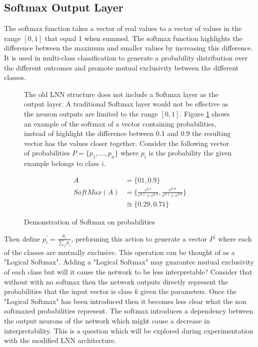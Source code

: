 \subsection{Softmax Output Layer}
The softmax function takes a vector of real values to a vector of values in the range $[0,1]$ that equal 1 when summed. The softmax function highlights the difference between the maximum and smaller values by increasing this difference. It is used in multi-class classification to generate a probability distribution over the different outcomes and promote mutual exclusivity between the different classes.
\begin{figure}[H]
\begin{minipage}[t]{0.57\textwidth}
	\vspace{0px}
	The old LNN structure does not include a Softmax layer as the output layer. A traditional Softmax layer would not be effective as the neuron outputs are limited to the range $[0,1]$. Figure \ref{fig:softmax-failure} shows an example of the softmax of a vector containing probabilities, instead of highlight the difference between 0.1 and 0.9 the resulting vector has the values closer together. Consider the following vector of probabilities $P = \{p_1, ..., p_n\}$ where $p_i$ is the probability the given example belongs to class $i$.
\end{minipage}
\hspace{3px}
\begin{minipage}[t]{0.4\textwidth}
\vspace{0px}
	\begin{align*}
		A &= \{01, 0.9\}\\
		SoftMax(A) &= \{ \frac{e^{0.1}}{e^{0.1} + e^{0.9}}, \frac{e^{0.9}}{e^{0.1} + e^{0.9}} \}\\
		&\approxeq \{ 0.29, 0.71 \}
	\end{align*}
\caption{Demonstration of Softmax on probabilities}
\label{fig:softmax-failure}

\end{minipage}
\end{figure}

 Then define $p_i^{'} = \frac{p_i}{\sum_j p_j}$, performing this action to generate a vector $P^{'}$ where each of the classes are mutually exclusive. This operation can be thought of as a "Logical Softmax". Adding a "Logical Softmax" may guarantee mutual exclusivity of each class but will it cause the network to be less interpretable? Consider that without with no softmax then the network outputs directly represent the probabilities that the input vector is class $k$ given the parameters. Once the "Logical Softmax" has been introduced then it becomes less clear what the non softmaxed probabilities represent. The softmax introduces a dependency between the output neurons of the network which might cause a decrease in interpretability. This is a question which will be explored during experimentation with the modified LNN architecture.

